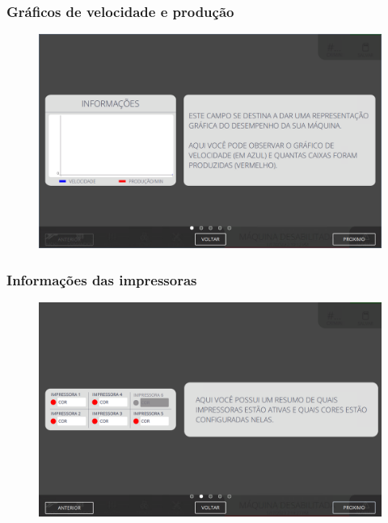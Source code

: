 \newpage
\thispagestyle{fancy}
\vspace*{40 pt}
\subsubsection{\small{Gráficos de velocidade e produção}} \label{sec:telaPrincipalGraficosDeVelocidadeEProducao}
\vspace*{\fill}
\begin{figure}[h]
    \centering
    \includegraphics[width=576 px,height=360 px]{src/imagesICV/01-main/2.png}
\end{figure}
\vspace*{\fill}

\newpage
\thispagestyle{fancy}
\vspace*{40 pt}
\subsubsection{\small{Informações das impressoras}} \label{sec:telaPrincipalInformacoesDasImpressoras}
\vspace*{\fill}
\begin{figure}[h]
    \centering
    \includegraphics[width=576 px,height=360 px]{src/imagesICV/01-main/3.png}
\end{figure}
\vspace*{\fill}

